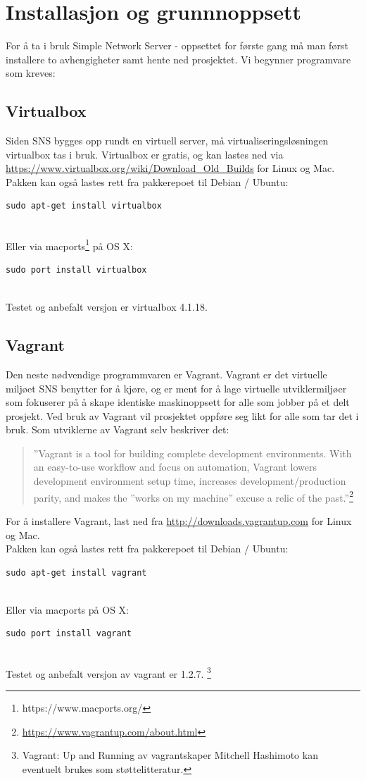 \documentclass{article}
\begin{document}
\section{Installasjon og grunnnoppsett}
For å ta i bruk Simple Network Server - oppsettet for første gang må man først installere to avhengigheter samt hente ned prosjektet. Vi begynner programvare som kreves:
\subsection{Virtualbox}
Siden SNS bygges opp rundt en virtuell server, må virtualiseringsløsningen virtualbox tas i bruk. Virtualbox er gratis, og kan lastes ned via \url{https://www.virtualbox.org/wiki/Download_Old_Builds} for Linux og Mac. Pakken kan også lastes rett fra pakkerepoet til Debian / Ubuntu: \\ 
\begin{lstlisting}
sudo apt-get install virtualbox
\end{lstlisting}
\\
Eller via macports\footnote{https://www.macports.org/} på OS X:
\begin{lstlisting}
sudo port install virtualbox
\end{lstlisting}
\\
Testet og anbefalt versjon er virtualbox 4.1.18. 
\subsection{Vagrant}
Den neste nødvendige programmvaren er Vagrant. Vagrant er det virtuelle miljøet SNS benytter for å kjøre, og er ment for å lage virtuelle utviklermiljøer som fokuserer på å skape identiske maskinoppsett for alle som jobber på et delt prosjekt. Ved bruk av Vagrant vil prosjektet oppføre seg likt for alle som tar det i bruk. Som utviklerne av Vagrant selv beskriver det: 
\begin{quote}
''Vagrant is a tool for building complete development environments. With an easy-to-use workflow and focus on automation, Vagrant lowers development environment setup time, increases development/production parity, and makes the ''works on my machine'' excuse a relic of the past.''\footnote{\url{https://www.vagrantup.com/about.html}}
\end{quote}
For å installere Vagrant, last ned fra \url{http://downloads.vagrantup.com} for Linux og Mac. \\
 Pakken kan også lastes rett fra pakkerepoet til Debian / Ubuntu: \\ 
\begin{lstlisting}
sudo apt-get install vagrant
\end{lstlisting}
\\
Eller via macports på OS X:
\begin{lstlisting}
sudo port install vagrant
\end{lstlisting}
\\
Testet og anbefalt versjon av vagrant er 1.2.7. 
\footnote{Vagrant: Up and Running av vagrantskaper Mitchell Hashimoto kan eventuelt brukes som støttelitteratur. }
\end{document}
